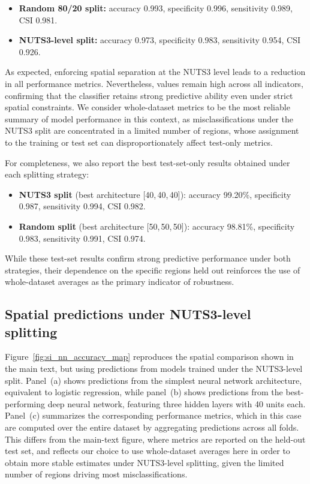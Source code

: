 \documentclass[11pt,a4paper]{article}
\begin{document}
\begin{itemize}
    \item \textbf{Random 80/20 split:} accuracy 0.993, specificity 0.996, sensitivity 0.989, CSI 0.981.
    \item \textbf{NUTS3-level split:} accuracy 0.973, specificity 0.983, sensitivity 0.954, CSI 0.926.
\end{itemize}

As expected, enforcing spatial separation at the NUTS3 level leads to a reduction in all performance metrics. Nevertheless, values remain high across all indicators, confirming that the classifier retains strong predictive ability even under strict spatial constraints. We consider whole-dataset metrics to be the most reliable summary of model performance in this context, as misclassifications under the NUTS3 split are concentrated in a limited number of regions, whose assignment to the training or test set can disproportionately affect test-only metrics.

For completeness, we also report the best test-set-only results obtained under each splitting strategy:

\begin{itemize}
    \item \textbf{NUTS3 split} (best architecture [40,\,40,\,40]): accuracy 99.20\%, specificity 0.987, sensitivity 0.994, CSI 0.982.
    \item \textbf{Random split} (best architecture [50,\,50,\,50]): accuracy 98.81\%, specificity 0.983, sensitivity 0.991, CSI 0.974.
\end{itemize}

While these test-set results confirm strong predictive performance under both strategies, their dependence on the specific regions held out reinforces the use of whole-dataset averages as the primary indicator of robustness.

\subsection{Spatial predictions under NUTS3-level splitting}

Figure~\ref{fig:si_nn_accuracy_map} reproduces the spatial comparison shown in the main text, but using predictions from models trained under the NUTS3-level split. Panel~(a) shows predictions from the simplest neural network architecture, equivalent to logistic regression, while panel~(b) shows predictions from the best-performing deep neural network, featuring three hidden layers with 40 units each. Panel~(c) summarizes the corresponding performance metrics, which in this case are computed over the entire dataset by aggregating predictions across all folds. This differs from the main-text figure, where metrics are reported on the held-out test set, and reflects our choice to use whole-dataset averages here in order to obtain more stable estimates under NUTS3-level splitting, given the limited number of regions driving most misclassifications.
\end{document}
